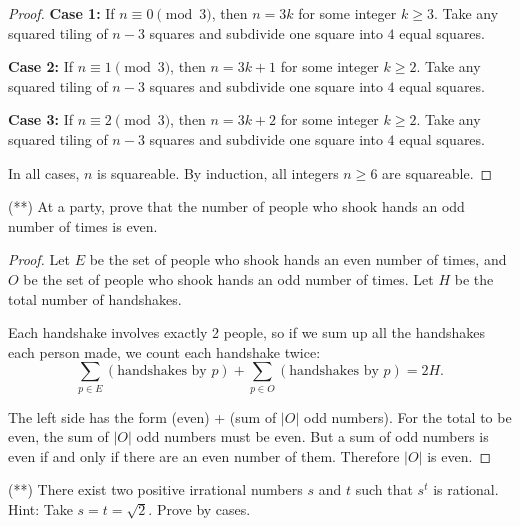\documentclass[12pt]{article}
\begin{document}
\begin{problem}
\begin{proof}
\textbf{Case 1:} If $n \equiv 0 \pmod{3}$, then $n = 3k$ for some integer $k \geq 3$. Take any squared tiling of $n-3$ squares and subdivide one square into $4$ equal squares.

\textbf{Case 2:} If $n \equiv 1 \pmod{3}$, then $n = 3k+1$ for some integer $k \geq 2$. Take any squared tiling of $n-3$ squares and subdivide one square into $4$ equal squares.

\textbf{Case 3:} If $n \equiv 2 \pmod{3}$, then $n = 3k+2$ for some integer $k \geq 2$. Take any squared tiling of $n-3$ squares and subdivide one square into $4$ equal squares.

In all cases, $n$ is squareable. By induction, all integers $n \geq 6$ are squareable.
\end{proof}
\end{problem}

\begin{problem}
(**) At a party, prove that the number of people who shook hands an odd number of times is even.

\begin{proof}
Let $E$ be the set of people who shook hands an even number of times, and $O$ be the set of people who shook hands an odd number of times. Let $H$ be the total number of handshakes.

Each handshake involves exactly 2 people, so if we sum up all the handshakes each person made, we count each handshake twice:
\[\sum_{p \in E} (\text{handshakes by } p) + \sum_{p \in O} (\text{handshakes by } p) = 2H.\]

The left side has the form (even) + (sum of $|O|$ odd numbers). For the total to be even, the sum of $|O|$ odd numbers must be even. But a sum of odd numbers is even if and only if there are an even number of them. Therefore $|O|$ is even.
\end{proof}
\end{problem}

\begin{problem}
(**) There exist two positive irrational numbers $s$ and $t$ such that $s^t$ is rational. Hint: Take $s = t = \sqrt{2}$. Prove by cases.
\end{problem}
\end{document}
